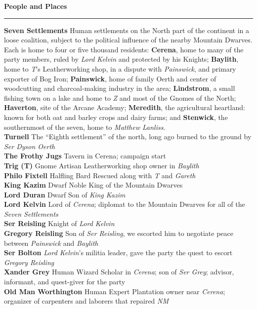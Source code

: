 \documentclass[letterpaper]{article}
\newcommand{\e}[1]{\emph{#1}}
\newcommand{\B}[1]{\textbf{#1}}
\newenvironment{notesection}[1]
{ {\huge \B{#1}}\hrule\vspace{0.5em}\begingroup\fontsize{9pt}{12pt}\selectfont}
{\endgroup}
\newcommand{\person}[3]{\B{#1
    \ifstrequal{#2}{M}{{\color{ProcessBlue}\male}}{%
    \ifstrequal{#2}{F}{\color{VioletRed}\female}{}}}{\scriptsize #3}}
\begin{document}
\twocolumn
\begin{notesection}{People and Places}
\B{Seven Settlements} Human settlements on the North part of the continent in a loose coalition, subject to the political influence of the nearby Mountain Dwarves. Each is home to four or five thousand residents: \B{Cerena}, home to many of the party members, ruled by \e{Lord Kelvin} and protected by his Knights; \B{Baylith}, home to \e{T}'s Leatherworking shop, in a dispute with \e{Painswick}, and primary exporter of Bog Iron; \B{Painswick}, home of family Oerth and center of woodcutting and charcoal-making industry in the area; \B{Lindstrom}, a small fishing town on a lake and home to \e{Z} and most of the Gnomes of the North; \B{Haverton}, site of the Arcane Academy; \B{Meredith}, the agricultural heartland: known for both oat and barley crops and dairy farms; and \B{Stenwick}, the southernmost of the seven, home to \e{Matthew Lanliss}.\\
\B{Turnell} The ``Eighth settlement'' of the north, long ago burned to the ground by \e{Ser Dyson Oerth} \\
\B{The Frothy Jugs} Tavern in Cerena; campaign start\\
\person{Trig (T)}{F}{Gnome Artisan} Leatherworking shop owner in \e{Baylith} \\
\person{Philo Fixtell}{M}{Halfling Bard} Rescued along with \e{T} and \e{Gareth}\\
\person{King Kazim}{M}{Dwarf Noble} King of the Mountain Dwarves\\
\person{Lord Duran}{M}{Dwarf} Son of \e{King Kazim}\\
\person{Lord Kelvin}{M}{} Lord of \e{Cerena}; diplomat to the Mountain Dwarves for all of the \e{Seven Settlements}\\
\person{Ser Reisling}{M}{} Knight of \e{Lord Kelvin}\\
\person{Gregory Reisling}{M}{} Son of \e{Ser Reisling}, we escorted him to negotiate peace between \e{Painswick} and \e{Baylith}\\
\person{Ser Bolton}{M}{} \e{Lord Kelvin}'s militia leader, gave the party the quest to escort \e{Gregory Reisling} \\
\person{Xander Grey}{M}{Human Wizard} Scholar in \e{Cerena}; son of \e{Ser Grey}; advisor, informant, and quest-giver for the party\\
\person{Old Man Worthington}{M}{Human Expert} Plantation owner near \e{Cerena}; organizer of carpenters and laborers that repaired \e{NM}\\

\end{notesection}
\end{document}
